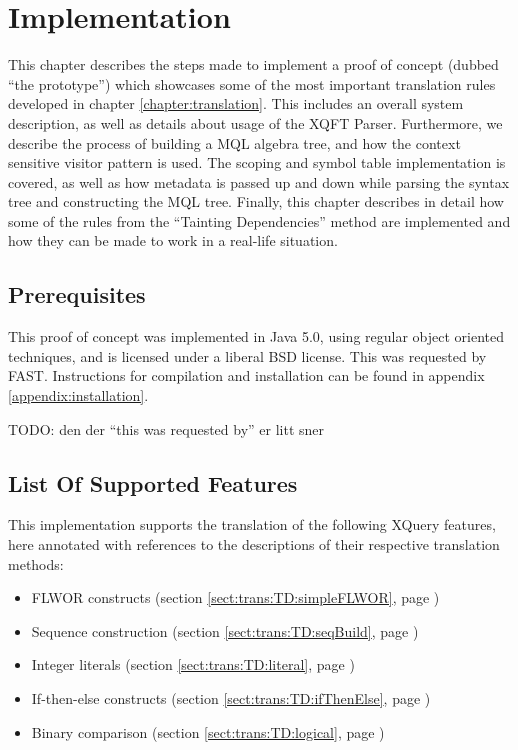 \chapter{Implementation}
\label{chapter:implementation}
This chapter describes the steps made to implement a proof of concept (dubbed
``the prototype'') which showcases some of the most important translation rules
developed in chapter \ref{chapter:translation}. This includes an overall system
description, as well as details about usage of the XQFT Parser. Furthermore, we
describe the process of building a MQL algebra tree, and how the context
sensitive visitor pattern is used. The scoping and symbol table implementation
is covered, as well as how metadata is passed up and down while parsing the
syntax tree and constructing the MQL tree. Finally, this chapter describes in
detail how some of the rules from the ``Tainting Dependencies'' method are
implemented and how they can be made to work in a real-life situation.

\section{Prerequisites}
This proof of concept was implemented in Java 5.0, using regular object
oriented techniques, and is licensed under a liberal BSD license.
This was requested by FAST. Instructions for compilation and installation can
be found in appendix \ref{appendix:installation}.

TODO: den der ``this was requested by'' er litt sner

\section{List Of Supported Features}
This implementation supports the translation of the following XQuery features,
here annotated with references to the descriptions of their respective
translation methods:
\begin{itemize}
  \item FLWOR constructs (section \ref{sect:trans:TD:simpleFLWOR}, page
  \pageref{sect:trans:TD:simpleFLWOR})
  \item Sequence construction (section \ref{sect:trans:TD:seqBuild}, page
  \pageref{sect:trans:TD:seqBuild})
  \item Integer literals (section \ref{sect:trans:TD:literal}, page
  \pageref{sect:trans:TD:litteral})
  \item If-then-else constructs (section \ref{sect:trans:TD:ifThenElse}, page
  \pageref{sect:trans:TD:ifThenElse})
  \item Binary comparison (section \ref{sect:trans:TD:logical}, page
  \pageref{sect:trans:TD:logical})
\end{itemize}

